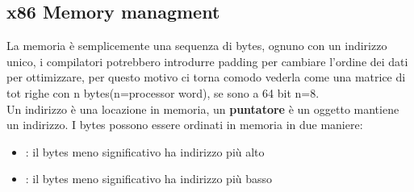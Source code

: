\documentclass[oneside,a4paper,11pt]{book}
\theoremstyle{italicstyle}
\theoremstyle{normStyle}
\begin{document}
\subsection{x86 Memory managment}
La memoria è semplicemente una sequenza di bytes, ognuno con un indirizzo unico, i compilatori potrebbero introdurre padding per cambiare l'ordine dei dati per ottimizzare, per questo motivo ci torna comodo vederla come una matrice di tot righe con n bytes(n=processor word), se sono a 64 bit n=8.\\
Un indirizzo è una locazione in memoria, un \textbf{puntatore} è un oggetto mantiene un indirizzo.
I bytes possono essere ordinati in memoria in due maniere:
\begin{itemize}
\item {}: il bytes meno significativo ha indirizzo più alto
\item {}: il bytes meno significativo ha indirizzo più basso
\end{itemize}  
\end{document}
